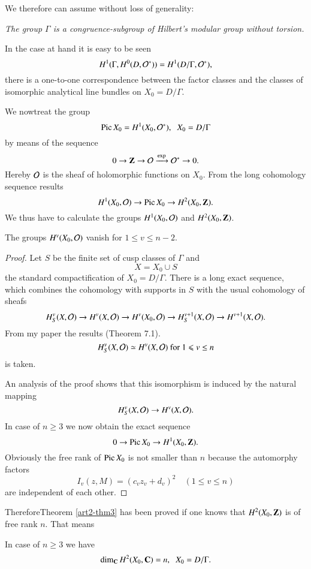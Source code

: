 We therefore can assume without loss of generality:

\textit{The group $\Gamma$ is a congruence-subgroup of Hilbert's modular group without torsion.}

In the case at hand it is easy to be seen
$$
H^1 (\Gamma, H^0 (D, \mathcal{O}^\ast)) = H^1 (D/ \Gamma, \mathcal{O}^\ast),
$$
\ie there is a one-to-one correspondence between the factor classes and the classes of isomorphic analytical line bundles on $X_0 = D/\Gamma$.

We now\pageoriginale  treat the group
$$
\operatorname{Pic} X_0 = H^1 (X_0, \mathcal{O}^\ast), \;\; X_0 = D/ \Gamma
$$
by means of the sequence
$$
0 \to \mathbf{Z} \to \mathcal{O}  \xrightarrow{\exp} \mathcal{O}^\ast \to 0.
$$
Hereby $\mathcal{O}$ is the sheaf of holomorphic functions on $X_0$. From the long cohomology sequence results
$$
H^1 (X_0, \mathcal{O}) \to \operatorname{Pic} X_0 \to H^2 (X_0, \mathbf{Z}).
$$
We thus have to calculate the groups $H^1 (X_0, \mathcal{O})$ and $H^2 (X_0, \mathbf{Z})$.

\begin{theorem}\label{art2-thm4}
The groups $H^v (X_0, \mathcal{O})$ vanish for $1 \leqslant v \leqslant n -2$.
\end{theorem}

\begin{proof}
Let $S$ be the finite set of cusp classes of $\Gamma$ and 
$$
X = X_0 \cup S
$$
the standard compactification of $X_0 = D/\Gamma$. There is a long exact sequence, which combines the cohomology with supports in $S$ with the usual cohomology of sheafs
$$
H^v_S (X, \mathcal{O}) \to H^v (X, \mathcal{O}) \to H^v (X_0, \mathcal{O}) \to H^{v+1}_S  (X, \mathcal{O}) \to H^{v+1} (X,\mathcal{O}).
$$
From my paper \cite{art2-key1} the results (Theorem 7.1).
$$
H^v_S (X, \mathcal{O}) \simeq H^v (X, \mathcal{O}) \text{ for } 1 \leqslant v \leq n
$$
is taken.

An analysis of the proof shows that this isomorphism is induced by the natural mapping 
$$
H^v_S (X, \mathcal{O}) \to H^v (X, \mathcal{O}).
$$
In case of $n \geqslant 3$ we now obtain the exact sequence
$$
0 \to \operatorname{Pic} X_0 \to H^1 (X_0, \mathbf{Z}).
$$
Obviously the free rank of $\operatorname{Pic} X_0$ is not smaller than $n$ because the automorphy factors
$$
I_v (z, M) = (c_v z_v + d_v)^2 \quad (1 \leqslant v \leqslant n)
$$
are independent of each other.
\end{proof}

Therefore\pageoriginale Theorem \ref{art2-thm3} has been proved if one knows that $H^2 (X_0, \mathbf{Z})$ is of free rank $n$. That means

\begin{theorem}\label{art2-thm5} 
In case of $n \geqslant 3$ we have
$$
\dim_{\mathbf{C}} H^2 (X_0, \mathbf{C}) = n, \;\; X_0 = D/\Gamma.
$$ 
\end{theorem}

